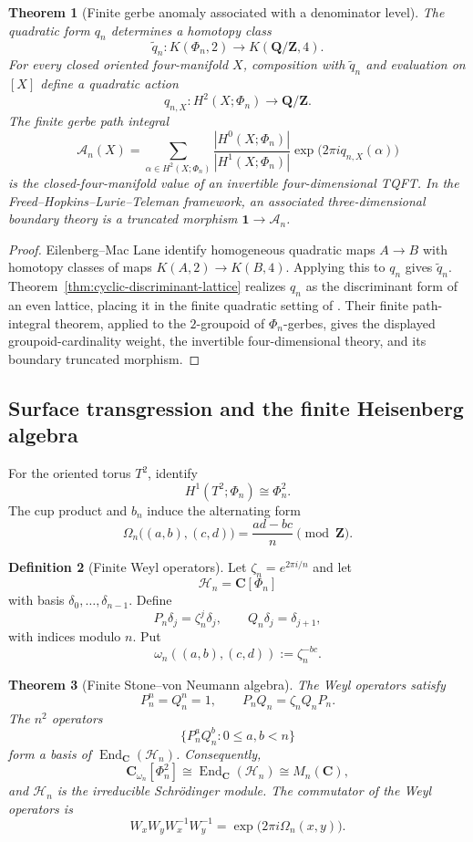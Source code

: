 \documentclass[11pt]{amsart}
\numberwithin{equation}{section}
\newtheorem{theorem}{Theorem}[section]
\theoremstyle{definition}
\newtheorem{definition}[theorem]{Definition}
\newcommand{\Z}{\mathbf Z}
\newcommand{\Q}{\mathbf Q}
\newcommand{\C}{\mathbf C}
\newcommand{\End}{\operatorname{End}}
\begin{document}
\begin{theorem}[Finite gerbe anomaly associated with a denominator level]
\label{thm:finite-gerbe-anomaly}
The quadratic form $q_n$ determines a homotopy class
\[
\widetilde q_n:K(\Phi_n,2)\longrightarrow K(\Q/\Z,4).
\]
For every closed oriented four-manifold $X$, composition with
$\widetilde q_n$ and evaluation on $[X]$ define a quadratic action
\[
q_{n,X}:H^2(X;\Phi_n)\longrightarrow\Q/\Z.
\]
The finite gerbe path integral
\[
\mathcal A_n(X)
=
\sum_{\alpha\in H^2(X;\Phi_n)}
\frac{|H^0(X;\Phi_n)|}{|H^1(X;\Phi_n)|}
\exp\bigl(2\pi i q_{n,X}(\alpha)\bigr)
\]
is the closed-four-manifold value of an invertible four-dimensional TQFT.
In the Freed--Hopkins--Lurie--Teleman framework, an associated
three-dimensional boundary theory is a truncated morphism
$\mathbf1\to\mathcal A_n$.
\end{theorem}

\begin{proof}
Eilenberg--Mac Lane identify homogeneous quadratic maps $A\to B$ with
homotopy classes of maps $K(A,2)\to K(B,4)$.  Applying this to $q_n$
gives $\widetilde q_n$.  Theorem~\ref{thm:cyclic-discriminant-lattice}
realizes $q_n$ as the discriminant form of an even lattice, placing it in
the finite quadratic setting of \cite[\S5.2]{FHLT}.  Their finite
path-integral theorem, applied to the $2$-groupoid of $\Phi_n$-gerbes,
gives the displayed groupoid-cardinality weight, the invertible
four-dimensional theory, and its boundary truncated morphism.
\end{proof}

\subsection{Surface transgression and the finite Heisenberg algebra}

For the oriented torus $T^2$, identify
\[
H^1(T^2;\Phi_n)\cong\Phi_n^2.
\]
The cup product and $b_n$ induce the alternating form
\[
\Omega_n\bigl((a,b),(c,d)\bigr)
=\frac{ad-bc}{n}\pmod\Z.
\]

\begin{definition}[Finite Weyl operators]
Let $\zeta_n=e^{2\pi i/n}$ and let
\[
\mathscr H_n=\C[\Phi_n]
\]
with basis $\delta_0,\dots,\delta_{n-1}$.  Define
\[
P_n\delta_j=\zeta_n^j\delta_j,
\qquad
Q_n\delta_j=\delta_{j+1},
\]
with indices modulo $n$.  Put
\[
\omega_n((a,b),(c,d)):=\zeta_n^{-bc}.
\]
\end{definition}

\begin{theorem}[Finite Stone--von Neumann algebra]
\label{thm:finite-stone-von-neumann}
The Weyl operators satisfy
\[
P_n^n=Q_n^n=1,
\qquad
P_nQ_n=\zeta_n Q_nP_n.
\]
The $n^2$ operators
\[
\{P_n^aQ_n^b:0\leq a,b<n\}
\]
form a basis of $\End_\C(\mathscr H_n)$.  Consequently,
\[
\C_{\omega_n}[\Phi_n^2]
\cong
\End_\C(\mathscr H_n)
\cong M_n(\C),
\]
and $\mathscr H_n$ is the irreducible Schr\"odinger module.  The
commutator of the Weyl operators is
\[
W_xW_yW_x^{-1}W_y^{-1}
=\exp\bigl(2\pi i\Omega_n(x,y)\bigr).
\]
\end{theorem}
\end{document}
